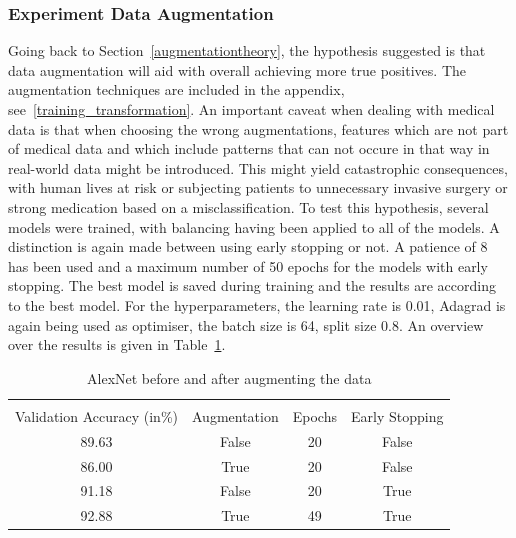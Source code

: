 \subsubsection{Experiment Data Augmentation}
Going back to Section~\ref{augmentationtheory}, the hypothesis suggested is that data augmentation will aid with overall achieving more true positives. The augmentation techniques are included in the appendix, see~\ref{training_transformation}. An important caveat when dealing with medical data is that when choosing the wrong augmentations, features which are not part of medical data and which include patterns that can not occure in that way in real-world data might be introduced. This might yield catastrophic consequences, with human lives at risk or subjecting patients to unnecessary invasive surgery or strong medication based on a misclassification. To test this hypothesis, several models were trained, with balancing having  been applied to all of the models. A distinction is again made between using early stopping or not. A patience of 8 has been used and a maximum number of 50 epochs for the models with early stopping. The best model is saved during training and the results are according to the best model. For the hyperparameters, the learning rate is 0.01, Adagrad is again being used as optimiser, the batch size is 64, split size 0.8. An overview over the results is given in Table~\ref{augmentation-table}. 

\begin{table}[ht]
	\caption{AlexNet before and after augmenting the data}\label{augmentation-table}
	\centering
	\begin{tabular}{cccc}
		\toprule
		\multicolumn{3}{c}{} \\
		Validation Accuracy (in\%)     & Augmentation    &     Epochs    &Early Stopping  \\
		\midrule
		89.63    &    False    &    20    &    False  \\
		86.00   &    True    &    20    &    False  \\
		91.18    &    False    &    20    &    True  \\
		92.88    &    True    &    49    &    True  \\
		\bottomrule
	\end{tabular}
\end{table}


